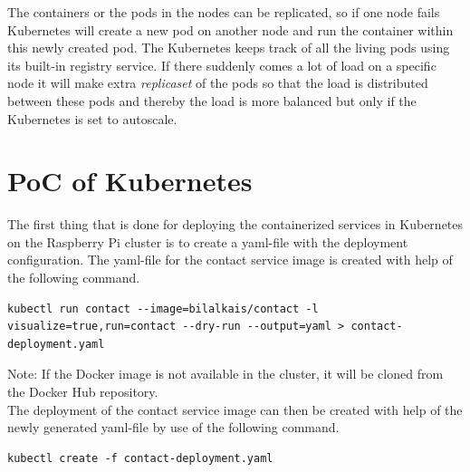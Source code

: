 The containers or the pods in the nodes can be replicated, so if one node fails Kubernetes will create a new pod on another node and run the container within this newly created pod. The Kubernetes keeps track of all the living pods using its built-in registry service.  
If there suddenly comes a lot of load on a specific node it will make extra \emph{replicaset} of the pods so that the load is distributed between these pods and thereby the load is more balanced but only if the Kubernetes is set to autoscale.\cite{bernstein2014containers}

\section{PoC of Kubernetes}




The first thing that is done for deploying the containerized services in Kubernetes on the Raspberry Pi cluster is to create a  yaml-file with the deployment configuration. The yaml-file for \eg the contact service image is created with help of the following command. 
\begin{lstlisting}[frame=single, ]
kubectl run contact --image=bilalkais/contact -l visualize=true,run=contact --dry-run --output=yaml > contact-deployment.yaml
\end{lstlisting}
Note: If the Docker image is not available in the cluster, it will be cloned from the Docker Hub repository.\\

The deployment of the contact service image can then be created with help of the newly generated yaml-file by use of the following command.
\begin{lstlisting}[frame=single, ]
kubectl create -f contact-deployment.yaml
\end{lstlisting}

